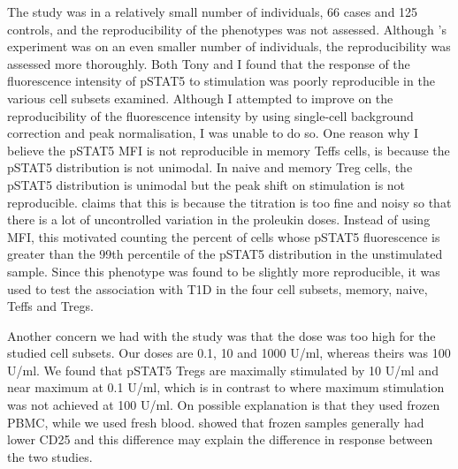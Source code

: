 The \citet{Long:2010ej} study was in a relatively small number of individuals, 66 cases and 125 controls, and the reproducibility of the phenotypes was not assessed.
Although 's experiment was on an even smaller number of individuals, the reproducibility was assessed more thoroughly.
Both Tony and I found that the response of the fluorescence intensity of pSTAT5 to stimulation was poorly reproducible in the various cell subsets examined.
Although I attempted to improve on the reproducibility of the fluorescence intensity by using single-cell background correction and peak normalisation, I was unable to do so.
One reason why I believe the pSTAT5 MFI is not reproducible in memory Teffs cells, is because the pSTAT5 distribution is not unimodal.
In naive and memory Treg cells, the pSTAT5 distribution is unimodal but the peak shift on stimulation is not reproducible.
 claims that this is because the titration is too fine and noisy so that there is a lot of uncontrolled variation in the proleukin doses.
Instead of using MFI, this motivated counting the percent of cells whose pSTAT5 fluorescence is greater than the 99th percentile of the pSTAT5 distribution in the unstimulated sample.
Since this phenotype was found to be slightly more reproducible, it was used to test the association with T1D in the four cell subsets, memory, naive, Teffs and Tregs.




Another concern we had with the \citet{Long:2010ej} study was that the dose was too high for the studied cell subsets.
Our doses are 0.1, 10 and 1000 U/ml, whereas theirs was 100 U/ml.
We found that pSTAT5 Tregs are maximally stimulated by 10 U/ml and near maximum at 0.1 U/ml,
which is in contrast to \citet{Long:2010ej} where maximum stimulation was not achieved at 100 U/ml.
On possible explanation is that they used frozen \gls{PBMC}, while we used fresh blood.
\cite{Dendrou:2009dv} showed that frozen samples generally had lower CD25 and this difference may explain the difference in response between the two studies.

